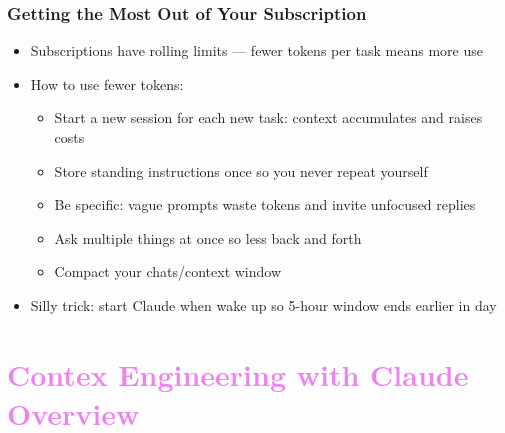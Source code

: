 \documentclass[aspectratio=169, 12pt]{beamer}
\begin{document}
\begin{frame}
\frametitle{Getting the Most Out of Your Subscription}

\begin{itemize}
    \item Subscriptions have rolling limits --- fewer tokens per task means more use
    \vspace{.05in}
    \item How to use fewer tokens:
    	\begin{itemize}
            \item[$\circ$] Start a new session for each new task: context accumulates and raises costs
            \item[$\circ$] Store standing instructions once so you never repeat yourself
            \item[$\circ$] Be specific: vague prompts waste tokens and invite unfocused replies
            \item[$\circ$] Ask multiple things at once so less back and forth
             \item[$\circ$] Compact your chats/context window
        \end{itemize}	
    \vspace{.05in}
    \item Silly trick: start Claude when wake up so 5-hour window ends earlier in day
\end{itemize}

\end{frame}



\section{\textcolor{violet}{Contex Engineering with Claude Overview \vspace{0.3in}}}
\end{document}
